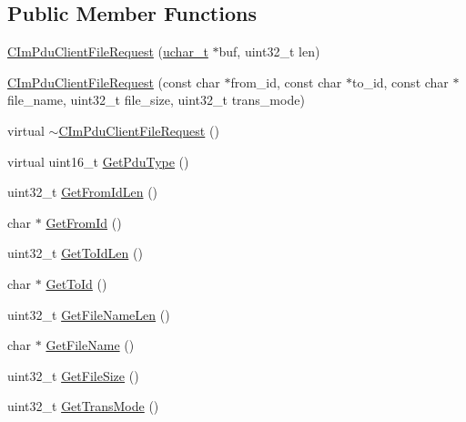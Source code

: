 \subsection*{Public Member Functions}
\begin{DoxyCompactItemize}
\item 
\hyperlink{class_c_im_pdu_client_file_request_a1ecbf4833d396beed2c382f78086141d}{C\+Im\+Pdu\+Client\+File\+Request} (\hyperlink{base_2ostype_8h_a124ea0f8f4a23a0a286b5582137f0b8d}{uchar\+\_\+t} $\ast$buf, uint32\+\_\+t len)
\item 
\hyperlink{class_c_im_pdu_client_file_request_a5e2696401a524a026c1198a0404a20ab}{C\+Im\+Pdu\+Client\+File\+Request} (const char $\ast$from\+\_\+id, const char $\ast$to\+\_\+id, const char $\ast$file\+\_\+name, uint32\+\_\+t file\+\_\+size, uint32\+\_\+t trans\+\_\+mode)
\item 
virtual \hyperlink{class_c_im_pdu_client_file_request_a107809d126307cf76ce8eeca8e87fb58}{$\sim$\+C\+Im\+Pdu\+Client\+File\+Request} ()
\item 
virtual uint16\+\_\+t \hyperlink{class_c_im_pdu_client_file_request_a2353cb6ef23cfe44cc39da55bceeb130}{Get\+Pdu\+Type} ()
\item 
uint32\+\_\+t \hyperlink{class_c_im_pdu_client_file_request_a2d5a0f382cb449a1ed0f0d15c8ff8a8e}{Get\+From\+Id\+Len} ()
\item 
char $\ast$ \hyperlink{class_c_im_pdu_client_file_request_a8b7d354225400646355dab444a0ea90b}{Get\+From\+Id} ()
\item 
uint32\+\_\+t \hyperlink{class_c_im_pdu_client_file_request_a270acd10733ab3fa0e118b58974f4f48}{Get\+To\+Id\+Len} ()
\item 
char $\ast$ \hyperlink{class_c_im_pdu_client_file_request_ad774ad302b3c6812bb4bcf078da1041c}{Get\+To\+Id} ()
\item 
uint32\+\_\+t \hyperlink{class_c_im_pdu_client_file_request_a4c9af07125ba8d25d38b1f3dd5d1195c}{Get\+File\+Name\+Len} ()
\item 
char $\ast$ \hyperlink{class_c_im_pdu_client_file_request_a3c13b51c0d8bd5ad995e0d2a3d48b0f7}{Get\+File\+Name} ()
\item 
uint32\+\_\+t \hyperlink{class_c_im_pdu_client_file_request_af197119b505b7619717d82c82d5ff83b}{Get\+File\+Size} ()
\item 
uint32\+\_\+t \hyperlink{class_c_im_pdu_client_file_request_a27bf71e00379dd5c2dfd840a275fe2aa}{Get\+Trans\+Mode} ()
\end{DoxyCompactItemize}
